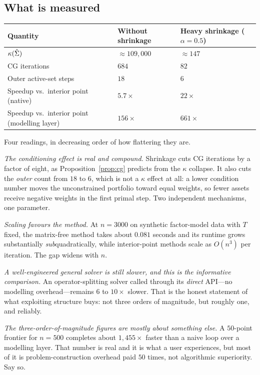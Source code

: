 \subsection{What is measured}

\begin{center}
\footnotesize
\begin{tabular}{@{}lll@{}}
\toprule
Quantity & Without shrinkage & Heavy shrinkage ($\alpha = 0.5$) \\
\midrule
$\kappa(\hat{\Sigma})$                    & $\approx 109{,}000$ & $\approx 147$ \\
CG iterations                         & $684$   & $82$ \\
Outer active-set steps                & $18$    & $6$ \\
Speedup vs.\ interior point (native)  & $5.7\times$ & $22\times$ \\
Speedup vs.\ interior point (modelling layer) & $156\times$ & $661\times$ \\
\bottomrule
\end{tabular}
\end{center}

Four readings, in decreasing order of how flattering they are.

\emph{The conditioning effect is real and compound.} Shrinkage cuts CG iterations by a
factor of eight, as Proposition~\ref{prop:cg} predicts from the $\kappa$ collapse. It
also cuts the \emph{outer} count from $18$ to $6$, which is not a $\kappa$ effect at
all: a lower condition number moves the unconstrained portfolio toward equal weights, so
fewer assets receive negative weights in the first primal step. Two independent
mechanisms, one parameter.

\emph{Scaling favours the method.} At $n = 3000$ on synthetic factor-model data with $T$
fixed, the matrix-free method takes about $0.081$ seconds and its runtime grows
substantially \emph{sub}quadratically, while interior-point methods scale as $O(n^3)$
per iteration. The gap widens with $n$.

\emph{A well-engineered general solver is still slower, and this is the informative
comparison.} An operator-splitting solver called through its \emph{direct} API---no
modelling overhead---remains $6$ to $10\times$ slower. That is the honest statement of
what exploiting structure buys: not three orders of magnitude, but roughly one, and
reliably.

\emph{The three-order-of-magnitude figures are mostly about something else.} A $50$-point
frontier for $n = 500$ completes about $1{,}455\times$ faster than a naive loop over a
modelling layer. That number is real and it is what a user experiences, but most of it
is problem-construction overhead paid $50$ times, not algorithmic superiority. Say so.

